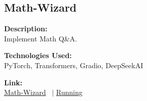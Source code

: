 \documentclass[a4paper,10pt]{article}
\begin{document}
\subsection*{Math-Wizard}
\noindent
\begin{minipage}[t]{0.4\textwidth}
  \textbf{Description:}\\
  Implement Math Q\&A.
\end{minipage}%
\begin{minipage}[t]{0.4\textwidth}
  \textbf{Technologies Used:}\\
  PyTorch, Transformers, Gradio, DeepSeekAI
\end{minipage}%
\begin{minipage}[t]{0.2\textwidth}
  \textbf{Link:}\\
  \href{https://github.com/EchoSingh/Math-Wizard}{Math-Wizard} \ $|$ 
  \href{https://huggingface.co/spaces/adi2606/Math_Wizard}{Running}
\end{minipage}

\end{document}
